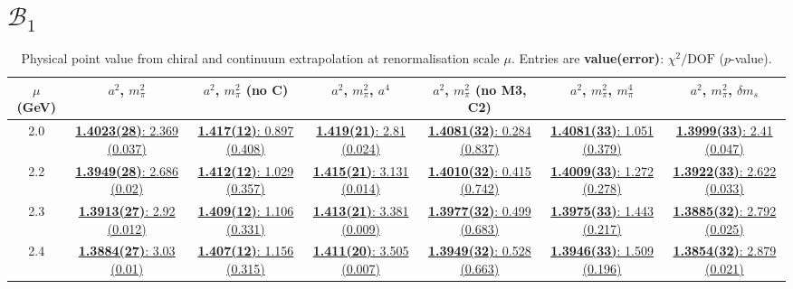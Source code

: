 \documentclass[12pt]{extarticle}
\begin{document}
\section{$\mathcal{B}_1$}
\begin{table}[h!]
\begin{center}
\begin{tabular}{|c|c|c|c|c|c|c|}
\hline
$\mu$ (GeV) & $a^2$, $m_\pi^2$& $a^2$, $m_\pi^2$ (no C)& $a^2$, $m_\pi^2$, $a^4$& $a^2$, $m_\pi^2$ (no M3, C2)& $a^2$, $m_\pi^2$, $m_\pi^4$& $a^2$, $m_\pi^2$, $\delta m_s$\\
\hline
2.0& \hyperlink{VVpAA/NPR/bag_a2m2_20.pdf.1}{\textbf{1.4023(28)}: 2.369 (0.037)} & \hyperlink{VVpAA/NPR/bag_a2m2noC_20.pdf.1}{\textbf{1.417(12)}: 0.897 (0.408)} & \hyperlink{VVpAA/NPR/bag_a2a4m2_20.pdf.1}{\textbf{1.419(21)}: 2.81 (0.024)} & \hyperlink{VVpAA/NPR/bag_a2m2mcut_20.pdf.1}{\textbf{1.4081(32)}: 0.284 (0.837)} & \hyperlink{VVpAA/NPR/bag_a2m2m4_20.pdf.1}{\textbf{1.4081(33)}: 1.051 (0.379)} & \hyperlink{VVpAA/NPR/bag_a2m2delm_20.pdf.1}{\textbf{1.3999(33)}: 2.41 (0.047)}\\
2.2& \hyperlink{VVpAA/NPR/bag_a2m2_22.pdf.1}{\textbf{1.3949(28)}: 2.686 (0.02)} & \hyperlink{VVpAA/NPR/bag_a2m2noC_22.pdf.1}{\textbf{1.412(12)}: 1.029 (0.357)} & \hyperlink{VVpAA/NPR/bag_a2a4m2_22.pdf.1}{\textbf{1.415(21)}: 3.131 (0.014)} & \hyperlink{VVpAA/NPR/bag_a2m2mcut_22.pdf.1}{\textbf{1.4010(32)}: 0.415 (0.742)} & \hyperlink{VVpAA/NPR/bag_a2m2m4_22.pdf.1}{\textbf{1.4009(33)}: 1.272 (0.278)} & \hyperlink{VVpAA/NPR/bag_a2m2delm_22.pdf.1}{\textbf{1.3922(33)}: 2.622 (0.033)}\\
2.3& \hyperlink{VVpAA/NPR/bag_a2m2_23.pdf.1}{\textbf{1.3913(27)}: 2.92 (0.012)} & \hyperlink{VVpAA/NPR/bag_a2m2noC_23.pdf.1}{\textbf{1.409(12)}: 1.106 (0.331)} & \hyperlink{VVpAA/NPR/bag_a2a4m2_23.pdf.1}{\textbf{1.413(21)}: 3.381 (0.009)} & \hyperlink{VVpAA/NPR/bag_a2m2mcut_23.pdf.1}{\textbf{1.3977(32)}: 0.499 (0.683)} & \hyperlink{VVpAA/NPR/bag_a2m2m4_23.pdf.1}{\textbf{1.3975(33)}: 1.443 (0.217)} & \hyperlink{VVpAA/NPR/bag_a2m2delm_23.pdf.1}{\textbf{1.3885(32)}: 2.792 (0.025)}\\
2.4& \hyperlink{VVpAA/NPR/bag_a2m2_24.pdf.1}{\textbf{1.3884(27)}: 3.03 (0.01)} & \hyperlink{VVpAA/NPR/bag_a2m2noC_24.pdf.1}{\textbf{1.407(12)}: 1.156 (0.315)} & \hyperlink{VVpAA/NPR/bag_a2a4m2_24.pdf.1}{\textbf{1.411(20)}: 3.505 (0.007)} & \hyperlink{VVpAA/NPR/bag_a2m2mcut_24.pdf.1}{\textbf{1.3949(32)}: 0.528 (0.663)} & \hyperlink{VVpAA/NPR/bag_a2m2m4_24.pdf.1}{\textbf{1.3946(33)}: 1.509 (0.196)} & \hyperlink{VVpAA/NPR/bag_a2m2delm_24.pdf.1}{\textbf{1.3854(32)}: 2.879 (0.021)}\\
\hline
\end{tabular}
\caption{Physical point value from chiral and continuum extrapolation at renormalisation scale $\mu$. Entries are \textbf{value(error)}: $\chi^2/\text{DOF}$ ($p$-value).}
\end{center}
\end{table}
\end{document}
